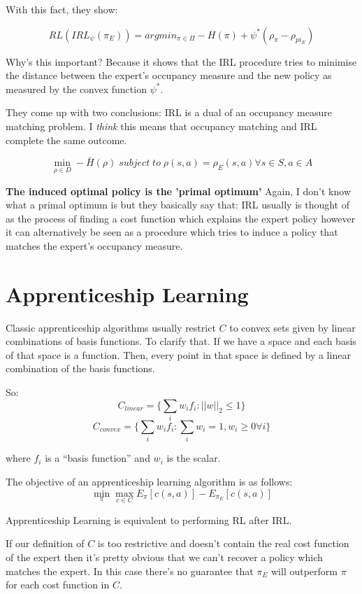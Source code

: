 \documentclass{article}
\begin{document}
With this fact, they show:

\[RL(IRL_{\psi}(\pi_{E})) = argmin_{\pi \in \Pi} -H(\pi) + \psi^{*}(\rho_{\pi} - \rho_{pi_{E}})\]

Why's this important? Because it shows that the IRL procedure tries to minimise the distance between the expert's occupancy measure and the new policy as measured by the convex function \(\psi^{*}\).

They come up with two conclusions:
IRL is a dual of an occupancy measure matching problem. I \emph{think} this means that occupancy matching and IRL complete the same outcome.

\[\min_{\rho \in D} - \bar{H}(\rho) \; subject \; to \; \rho(s,a) = \rho_{E}(s,a) \forall s \in S, a \in A\]

\textbf{The induced optimal policy is the 'primal optimum'} Again, I don't know what a primal optimum is but they basically say that: IRL usually is thought of as the process of finding a cost function which explains the expert policy however it can alternatively be seen as a procedure which tries to induce a policy that matches the expert's occupancy measure.

\section{Apprenticeship Learning}

Classic apprenticeship algorithms usually restrict \(C\) to convex sets given by linear combinations of basis functions.
To clarify that. If we have a space and each basis of that space is a function. Then, every point in that space is defined by a linear combination of the basis functions.

So:
\[C_{linear} = \{\sum_{i}w_{i}f_{i} : ||w||_{2} \le 1\}\]
\[C_{convex} = \{\sum_{i}w_{i}f_{i} : \sum_{i}w_{i}=1, w_{i} \ge 0 \forall i\}\]

where \(f_{i}\) is a ``basis function'' and \(w_i\) is the scalar.

The objective of an apprenticeship learning algorithm is as follows:
\[\min_{\pi} \max_{c \in C} E_{\pi} [c(s, a)] - E_{\pi_{E}}[c(s,a)]\]

Apprenticeship Learning is equivalent to performing RL after IRL.

If our definition of \(C\) is too restrictive and doesn't contain the real cost function of the expert then it's pretty obvious that we can't recover a policy which matches the expert. In this case there's no guarantee that \(\pi_{E}\) will outperform \(\pi\) for each cost function in \(C\).
\end{document}
